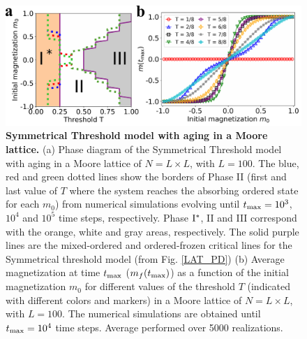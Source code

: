 \begin{figure}[b]
        \centering
        \includegraphics[width=\textwidth]{Figs/Aging_STM/FIG11.pdf}
        \caption{\label{LAT_PDAGING} \textbf{Symmetrical Threshold model with aging in a Moore lattice.} (a) Phase diagram of the Symmetrical Threshold model with aging in a Moore lattice of $N = L \times L$, with $L = 100$. The blue, red and green dotted lines show the borders of Phase II (first and last value of $T$ where the system reaches the absorbing ordered state for each $m_0$) from numerical simulations evolving until $t_{\rm max} = 10^3$, $10^4$ and $10^5$ time steps, respectively. Phase ${\rm I}^{*}$, II and III correspond with the orange, white and gray areas, respectively. The solid purple lines are the mixed-ordered and ordered-frozen critical lines for the Symmetrical threshold model (from Fig. \ref{LAT_PD}) (b) Average magnetization at time $t_{\rm max}$ ($m_f(t_{\rm max})$) as a function of the initial magnetization $m_0$ for different values of the threshold $T$ (indicated with different colors and markers) in a Moore lattice of $N = L \times L$, with $L = 100$. The numerical simulations are obtained until $t_{\rm max} = 10^4$ time steps. Average performed over 5000 realizations.}
\end{figure}

